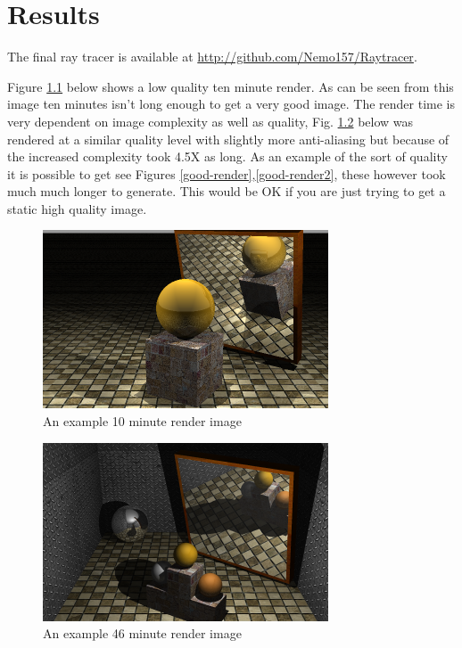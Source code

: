 \chapter{Results}
  The final ray tracer is available at \url{http://github.com/Nemo157/Raytracer}.

  Figure \ref{example} below shows a low quality ten minute render.  As can be
  seen from this image ten minutes isn't long enough to get a very good image.
  The render time is very dependent on image complexity as well as quality, Fig.
  \ref{example2} below was rendered at a similar quality level with slightly
  more anti-aliasing but because of the increased complexity took 4.5X as long.
  As an example of the sort of quality it is possible to get see Figures
  \ref{good-render},\ref{good-render2}, these however took much much longer to
  generate.  This would be OK if you are just trying to get a static high
  quality image.

  \begin{figure}[p]
    \centering
    \includegraphics{images/example.png}
    \caption{An example 10 minute render image\label{example}}
  \end{figure}

  \begin{figure}[p]
    \centering
    \includegraphics{images/example2.png}
    \caption{An example 46 minute render image\label{example2}}
  \end{figure}

